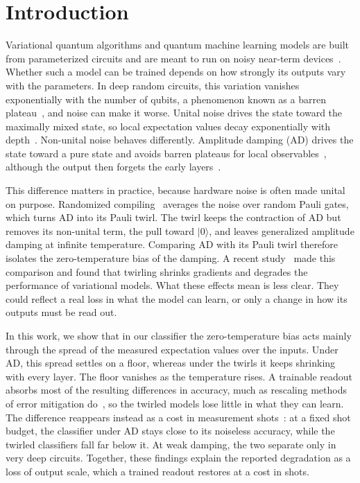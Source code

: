\documentclass[
 aps,pra,
 twocolumn,
 superscriptaddress,
 longbibliography,
 nofootinbib
]{revtex4-2}
\providecommand{\ket}[1]{\lvert #1 \rangle}
\begin{document}
\section{Introduction}
\label{sec:intro}

Variational quantum algorithms and quantum machine learning models are built
from parameterized circuits and are meant to run on noisy near-term
devices~\cite{preskill2018nisq,cerezo2021variational,bharti2022noisy}. Whether
such a model can be trained depends on how strongly its outputs vary with the
parameters. In deep random circuits, this variation vanishes exponentially with
the number of qubits, a phenomenon known as a barren
plateau~\cite{mcclean2018barren,cerezo2021cost,larocca2025barren}, and noise can
make it worse. Unital noise drives the state toward the maximally mixed state,
so local expectation values decay exponentially with
depth~\cite{wang2021noiseinduced,stilckfranca2021limitations}. Non-unital noise
behaves differently. Amplitude damping (AD) drives the state toward a pure state
and avoids barren plateaus for local observables~\cite{mele2026noise}, although
the output then forgets the early
layers~\cite{schumann2024emergence,singkanipa2025beyond}.

This difference matters in practice, because hardware noise is often made
unital on purpose. Randomized
compiling~\cite{wallman2016noise,hashim2021randomized} averages the noise over
random Pauli gates, which turns AD into its Pauli twirl. The twirl keeps the
contraction of AD but removes its non-unital term, the pull toward $\ket{0}$,
and leaves generalized amplitude damping at infinite temperature. Comparing AD
with its Pauli twirl therefore isolates the zero-temperature bias of the
damping. A recent study~\cite{vanrossum2026biased} made
this comparison and found that twirling shrinks gradients and degrades the
performance of variational models. What these effects mean is less clear. They
could reflect a real loss in what the model can learn, or only a change in how
its outputs must be read out.

In this work, we show that in our classifier the zero-temperature bias acts mainly
through the spread of the measured expectation values over the inputs. Under
AD, this spread settles on a floor, whereas under the twirls it keeps shrinking
with every layer. The floor vanishes as the temperature rises. A trainable
readout absorbs most of the resulting differences in accuracy, much as
rescaling methods of error mitigation do~\cite{vovrosh2021simple}, so the
twirled models lose little in what they can learn. The difference reappears
instead as a cost in measurement shots~\cite{wang2024errormitigation}: at a
fixed shot budget, the classifier under AD stays close to its noiseless
accuracy, while the twirled classifiers fall far below it. At weak damping, the
two separate only in very deep circuits.
Together, these findings explain the reported degradation as a loss of output scale,
which a trained readout restores at a cost in shots.
\end{document}
